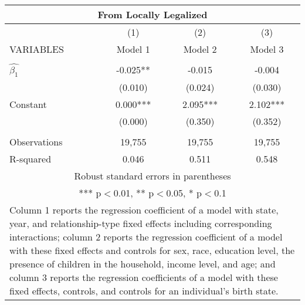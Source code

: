 \begin{tabular}{lccc}
\multicolumn{4}{c}{From Locally Legalized} \\ \hline
 & (1) & (2) & (3) \\
VARIABLES & Model 1 & Model 2 & Model 3 \\ \hline
 &  &  &  \\
$\hat{\beta_1}$ & -0.025** & -0.015 & -0.004 \\
 & (0.010) & (0.024) & (0.030) \\
Constant & 0.000*** & 2.095*** & 2.102*** \\
 & (0.000) & (0.350) & (0.352) \\
 &  &  &  \\
Observations & 19,755 & 19,755 & 19,755 \\
 R-squared & 0.046 & 0.511 & 0.548 \\ \hline
\multicolumn{4}{c}{ Robust standard errors in parentheses} \\
\multicolumn{4}{c}{ *** p$<$0.01, ** p$<$0.05, * p$<$0.1} \\
\multicolumn{4}{p{0.8\linewidth}}{\small Column 1 reports the regression coefficient of a model with state, year, and relationship-type fixed effects including corresponding interactions; column 2 reports the regression coefficient of a model with these fixed effects and controls for sex, race, education level, the presence of children in the household, income level, and age; and column 3 reports the regression coefficients of a model with these fixed effects, controls, and controls for an individual’s birth state.} \\
\end{tabular}

